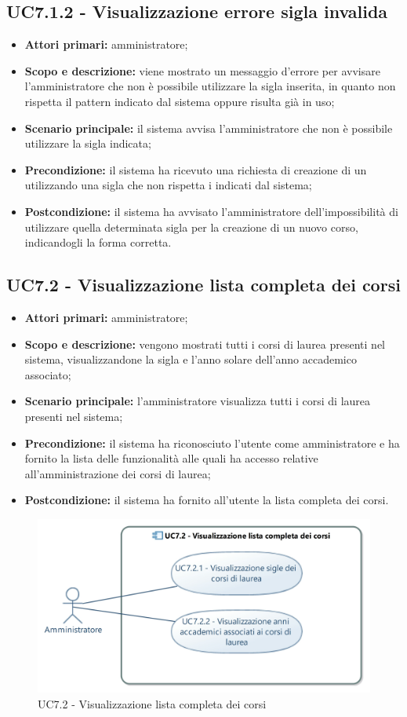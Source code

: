 \documentclass[AnalisiDeiRequisiti.tex]{subfiles}
\begin{document}
\subsection{UC7.1.2 - Visualizzazione errore sigla invalida}
\begin{itemize}
	\item \textbf{Attori primari:} amministratore;
	\item \textbf{Scopo e descrizione:} viene mostrato un messaggio d'errore per avvisare l'amministratore che non è possibile utilizzare la sigla inserita, in quanto non rispetta il pattern indicato dal sistema oppure risulta già in uso;
	\item \textbf{Scenario principale:} il sistema avvisa l'amministratore che non è possibile utilizzare la sigla indicata;
	\item \textbf{Precondizione:} il sistema ha ricevuto una richiesta di creazione di un  utilizzando una sigla che non rispetta i  indicati dal sistema; 
	\item \textbf{Postcondizione:} il sistema ha avvisato l'amministratore dell'impossibilità di utilizzare quella determinata sigla per la creazione di un nuovo corso, indicandogli la forma corretta.
\end{itemize}

\subsection{UC7.2 - Visualizzazione lista completa dei corsi}
\begin{itemize}
	\item \textbf{Attori primari:} amministratore;
	\item \textbf{Scopo e descrizione:} vengono mostrati tutti i corsi di laurea presenti nel sistema, visualizzandone la sigla e l'anno solare dell'anno accademico associato;
	\item \textbf{Scenario principale:} l'amministratore visualizza tutti i corsi di laurea presenti nel sistema;
	\item \textbf{Precondizione:} il sistema ha riconosciuto l'utente come amministratore e ha fornito la lista delle funzionalità alle quali ha accesso relative all'amministrazione dei corsi di laurea; 
	\item \textbf{Postcondizione:} il sistema ha fornito all'utente la lista completa dei corsi.
\end{itemize}
\begin{figure}[H]
	\centering
	\includegraphics[width=0.8\linewidth]{UC7_2.jpg}
	\caption{UC7.2 - Visualizzazione lista completa dei corsi}
	\label{fig:UC7.2 - Visualizzazione lista completa dei corsi}
\end{figure}
\end{document}
